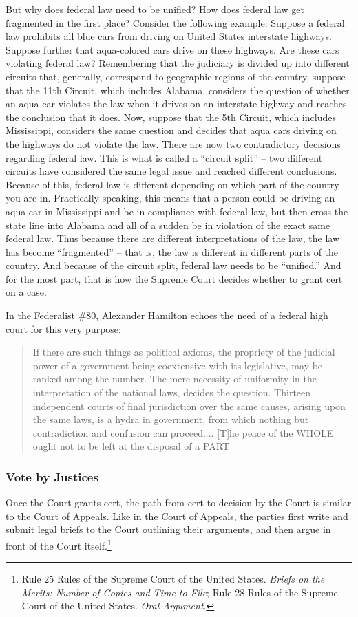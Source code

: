 But why does federal law need to be unified?  How does federal law get fragmented in the first place?
Consider the following example:
Suppose a federal law prohibits all blue cars from driving on United States interstate highways.  Suppose further that aqua-colored cars drive on these highways.  Are these cars violating federal law?
Remembering that the judiciary is divided up into different circuits that, generally, correspond to geographic regions of the country, suppose that the 11th Circuit, which includes Alabama, considers the question of whether an aqua car violates the law when it drives on an interstate highway and reaches the conclusion that it does.  Now, suppose that the 5th Circuit, which includes Mississippi, considers the same question and decides that aqua cars driving on the highways do not violate the law.  There are now two contradictory decisions regarding federal law. This is what is called a ``circuit split'' -- two different circuits have considered the same legal issue and reached different conclusions.  Because of this, federal law is different depending on which part of the country you are in.  Practically speaking, this means that a person could be driving an aqua car in Mississippi and be in compliance with federal law, but then cross the state line into Alabama and all of a sudden be in violation of the exact same federal law.  Thus because there are different interpretations of the law, the law has become ``fragmented'' -- that is, the law is different in different parts of the country.  And because of the circuit split, federal law needs to be ``unified.''  And for the most part, that is how the Supreme Court decides whether to grant cert on a case.

In the Federalist \#80, Alexander Hamilton echoes the need of a federal high court for this very purpose:

\begin{quote}
If there are such things as political axioms, the propriety of the judicial power of a government being coextensive with its legislative, may be ranked among the number. 
The mere necessity of uniformity in the interpretation of the national laws, decides the question. Thirteen independent courts of final jurisdiction over the same causes, arising upon the same laws, is a hydra in government, from which nothing but contradiction and confusion can proceed....  [T]he peace of the WHOLE ought not to be left at the disposal of a PART
\end{quote}


\subsubsection{Vote by Justices}
Once the Court grants cert, the path from cert to decision by the Court is similar to the Court of Appeals.  Like in the Court of Appeals, the parties first write and submit legal briefs to the Court outlining their arguments, and then argue in front of the Court itself.\footnote{Rule 25 Rules of the Supreme Court of the United States. \textit{Briefs on the Merits: Number of Copies and Time to File}; Rule 28 Rules of the Supreme Court of the United States. \textit{Oral Argument}.}

